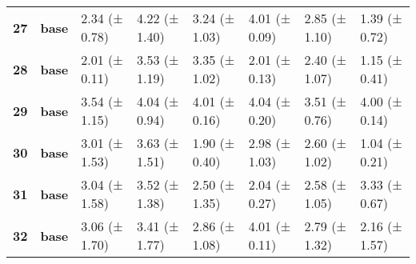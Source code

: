 \begin{longtable}{llllllll}
\cline{1-8}
\textbf{27} & \textbf{base} & 2.34 (± 0.78) & 4.22 (± 1.40) & 3.24 (± 1.03) & 4.01 (± 0.09) & 2.85 (± 1.10) & 1.39 (± 0.72) \\
\cline{1-8}
\textbf{28} & \textbf{base} & 2.01 (± 0.11) & 3.53 (± 1.19) & 3.35 (± 1.02) & 2.01 (± 0.13) & 2.40 (± 1.07) & 1.15 (± 0.41) \\
\cline{1-8}
\textbf{29} & \textbf{base} & 3.54 (± 1.15) & 4.04 (± 0.94) & 4.01 (± 0.16) & 4.04 (± 0.20) & 3.51 (± 0.76) & 4.00 (± 0.14) \\
\cline{1-8}
\textbf{30} & \textbf{base} & 3.01 (± 1.53) & 3.63 (± 1.51) & 1.90 (± 0.40) & 2.98 (± 1.03) & 2.60 (± 1.02) & 1.04 (± 0.21) \\
\cline{1-8}
\textbf{31} & \textbf{base} & 3.04 (± 1.58) & 3.52 (± 1.38) & 2.50 (± 1.35) & 2.04 (± 0.27) & 2.58 (± 1.05) & 3.33 (± 0.67) \\
\cline{1-8}
\textbf{32} & \textbf{base} & 3.06 (± 1.70) & 3.41 (± 1.77) & 2.86 (± 1.08) & 4.01 (± 0.11) & 2.79 (± 1.32) & 2.16 (± 1.57) \\
\cline{1-8}
\end{longtable}
